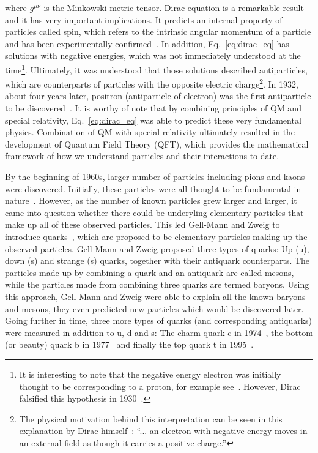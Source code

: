 where $g^{\mu\nu}$ is the Minkowski metric tensor.
Dirac equation is a remarkable result and it has very important implications.
It predicts an internal property of particles called spin, 
which refers to the intrinsic angular momentum of a particle and has been
experimentally confirmed~\cite{Dirac:1928hu}. In addition, Eq.~\ref{eq:dirac_eq} has solutions with negative
energies, which was not immediately understood at the time\footnote{It is interesting to note
that the negative energy electron was initially thought to be corresponding to a proton,
for example see~\cite{Weyl:1929fm}. However, Dirac falsified this hypothesis
in 1930~\cite{Dirac:1930ek}.}. 
Ultimately, it was understood that those solutions described
antiparticles, which are counterparts of particles with the opposite electric 
charge\footnote{The physical motivation behind this interpretation can be seen 
in this explanation by Dirac himself~\cite{Dirac:1930ek}: 
``... an electron with negative energy moves in an external
field as though it carries a positive charge.''}. 
In 1932, about four years later, positron (antiparticle of electron) 
was the first antiparticle to be discovered~\cite{Anderson:1932zz}. 
It is worthy of note that by combining principles of QM and special relativity,
Eq.~\ref{eq:dirac_eq} was able to predict these very fundamental physics.
Combination of QM with special relativity ultimately resulted in the development of 
Quantum Field Theory (QFT), which provides the mathematical framework 
of how we understand particles and their interactions to date.

By the beginning of 1960s, larger number of particles including
pions and kaons were discovered. Initially, these particles were all thought to 
be fundamental in nature~\cite{Riordan:1992hr}. 
However, as the number of known particles grew larger and larger, it came into 
question whether there could be
underyling elementary particles that make up all of these observed particles. This led 
Gell-Mann and Zweig to introduce quarks~\cite{Gell-Mann:1964ewy}, which are proposed to
be elementary particles making up the observed particles. Gell-Mann and Zweig proposed 
three types of quarks:
Up (u), down (s) and strange (s) quarks, together with their antiquark counterparts.
The particles made up by combining a quark and an antiquark are called mesons, while the particles made
from combining three quarks are termed baryons. Using this approach, Gell-Mann and Zweig were able to
explain all the known baryons and mesons, they even predicted new particles which would be discovered 
later\cite{Riordan:1992hr}. Going further in time, three more types of quarks (and corresponding 
antiquarks) were measured in addition to u, d and s: The charm quark c in 1974~\cite{E598:1974sol}, the
bottom (or beauty) quark b in 1977~\cite{E288:1977xhf} and finally the top quark t in 1995~\cite{D0:1995jca}.

